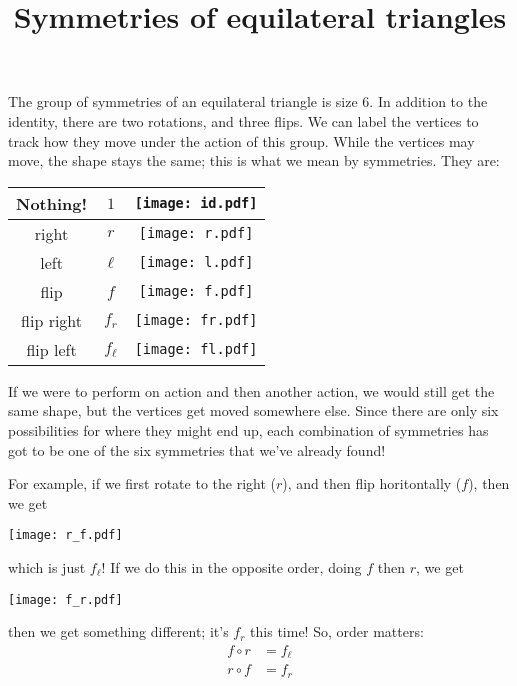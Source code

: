 \documentclass[12pt]{report}
\title{Symmetries of equilateral triangles}
\begin{document}
\thispagestyle{empty}

The group of symmetries of an equilateral triangle is size 6.  In
addition to the identity, there are two rotations, and three flips.
We can label the vertices to track how they move under the action of
this group.  While the vertices may move, the shape stays the same; this
is what we mean by symmetries.  They are:
\begin{figure*}
   \centering
   \begin{tabular}{|c|c|c|}
     \hline
     Nothing! & $1$ & \texttt{[image: id.pdf]}\\
     \hline
     right & $r$ & \texttt{[image: r.pdf]}\\
     \hline
     left & $\ell$ &\texttt{[image: l.pdf]}\\
     \hline
     flip & $f$ & \texttt{[image: f.pdf]}\\
     \hline
     flip right & $f_r$ &\texttt{[image: fr.pdf]}\\
     \hline
     flip left & $f_\ell$ & \texttt{[image: fl.pdf]}\\
     \hline
   \end{tabular}
\end{figure*}

If we were to perform on action and then another action, we would
still get the same shape, but the vertices get moved somewhere else.
Since there are only six possibilities for where they might end up,
each combination of symmetries has got to be one of the six symmetries
that we've already found!

For example, if we first rotate to the right ($r$), and then flip
horitontally ($f$), then we get
\begin{figure*}[h]
  \centering
   \texttt{[image: r\_f.pdf]}
\end{figure*}
which is just $f_\ell$!  If we do this in the opposite order, doing $f$
then $r$, we get
\begin{figure*}[h]
  \centering
   \texttt{[image: f\_r.pdf]}
\end{figure*}
then we get something different; it's $f_r$ this time!  So, order matters:
\begin{eqnarray*}
  f \circ r &= f_\ell\\
  r \circ f &= f_r\\
\end{eqnarray*}
\end{document}
